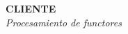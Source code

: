 \begin{frame}
    \begin{columns}[T]
        \begin{column}{.3\textwidth}
            \begin{center}
                \textbf{CLIENTE}\\
                \textit{Procesamiento de functores}\\[1cm]

\end{center}
\end{column}
\end{columns}
\end{frame}
